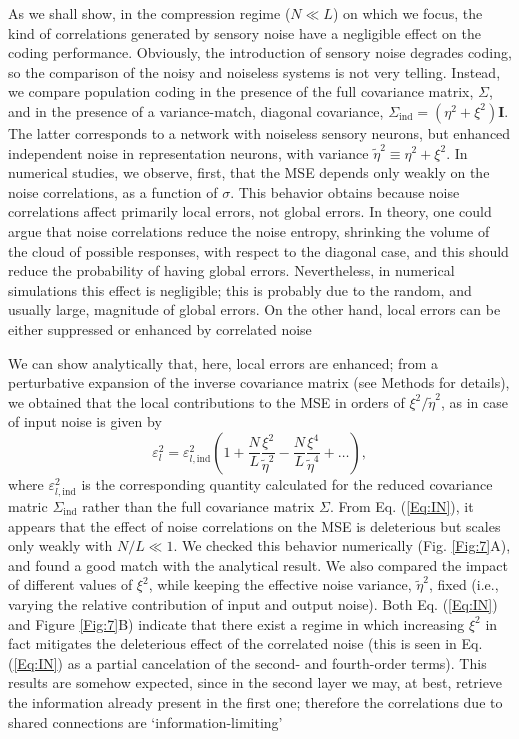 \documentclass[a4paper]{article}%
\begin{document}
As we shall show, in the compression regime ($N\ll L$) on which we focus, the
kind of correlations generated by sensory noise have a negligible effect on
the coding performance. Obviously, the introduction of sensory noise degrades
coding, so the comparison of the noisy and noiseless systems is not very
telling. Instead, we compare population coding in the presence of the full
covariance matrix, $\Sigma$, and in the presence of a variance-match, diagonal
covariance, $\Sigma_{\text{ind}}=(\eta^{2}+\xi^{2})\mathbf{I}$. The latter
corresponds to a network with noiseless sensory neurons, but enhanced
independent noise in representation neurons, with variance $\tilde{\eta}
^{2}\equiv\eta^{2}+\xi^{2}$. In numerical studies, we observe, first, that the MSE
depends only weakly on the noise correlations, as a function of $\sigma$. This behavior obtains because noise
correlations affect primarily local errors, not global errors. In theory, one could argue that noise correlations reduce the noise entropy, shrinking the volume of the cloud of possible responses, with respect to the diagonal case, and this should reduce the probability of having global errors. Nevertheless, in numerical simulations this effect is negligible; this is probably due to the random, and usually large, magnitude of global errors. On the other hand, local errors can be either suppressed or enhanced by correlated
noise \cite[]{daSilveira2021ThePopulations}

We can show analytically that, here, local errors are enhanced; from a
perturbative expansion of the inverse covariance matrix (see Methods for
details), we obtained that the local contributions to the MSE in orders of
$\xi^{2}/\tilde{\eta}^{2}$, as in case of input noise is given by
\begin{equation}
\varepsilon_{l}^{2}=\varepsilon_{l,\text{ind}}^{2}\left(  1+\frac{N}{L}
\frac{\xi^{2}}{\tilde{\eta}^{2}}-\frac{N}{L}\frac{\xi^{4}}{\tilde{\eta}^{4}
}+\ldots\right)  ,\label{Eq:IN}
\end{equation}
where $\varepsilon_{l,\text{ind}}^{2}$ is the corresponding quantity
calculated for the reduced covariance matric $\Sigma_{\text{ind}}$ rather than
the full covariance matrix $\Sigma$. From Eq. (\ref{Eq:IN}), it appears that
the effect of noise correlations on the MSE is deleterious but scales only
weakly with $N/L\ll1$. We checked this behavior numerically (Fig.
\ref{Fig:7}A), and found a good match with the analytical result. We also
compared the impact of different values of $\xi^{2}$, while keeping the
effective noise variance, $\tilde{\eta}^{2}$, fixed (i.e., varying the
relative contribution of input and output noise). Both Eq. (\ref{Eq:IN}) and
Figure \ref{Fig:7}B) indicate that there exist a regime in which increasing
$\xi^{2}$ in fact mitigates the deleterious effect of the correlated noise
(this is seen in Eq. (\ref{Eq:IN}) as a partial cancelation of the second- and
fourth-order terms). This results are somehow expected, since in the second layer we may, at best, retrieve the information already present in the first one; therefore the correlations due to shared connections are `information-limiting' \cite[]{Moreno-Bote2014Information-limitingCorrelations}
\end{document}
